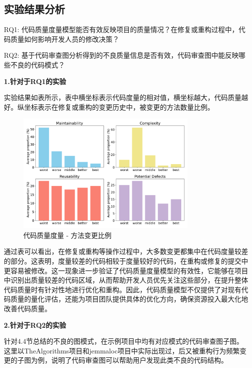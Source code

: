
\subsection{实验结果分析}

RQ1: 代码质量度量模型能否有效反映项目的质量情况？在修复或重构过程中，代码质量如何影响开发人员的修改决策？

RQ2: 基于代码审查图分析得到的不良质量信息是否有效，代码审查图中能反映哪些不良的代码模式？


\textbf{1.针对于RQ1的实验}


实验结果如表所示，表中横坐标表示代码度量的相对值，横坐标越大，代码质量越好。纵坐标表示在修复或重构的变更历史中，被变更的方法数量比例。

\begin{figure}[h]
\centering
\includegraphics[width = 0.8\textwidth]{figures/3_度量模型分析实验.pdf}
\caption{代码质量度量 - 方法变更比例}
\label{1_度量模型分析实验}
\end{figure}


通过表可以看出，在修复或重构等操作过程中，大多数变更都集中在代码度量较差的部分。这表明，度量较差的代码相较于度量较好的代码，在重构或修复的提交中更容易被修改。这一现象进一步验证了代码质量度量模型的有效性，它能够在项目中识别出质量较差的代码区域，从而帮助开发人员优先关注这些部分，在提升整体代码质量时有针对性地进行优化和重构。因此，代码质量模型不仅提供了对现有代码质量的量化评估，还能为项目团队提供具体的优化方向，确保资源投入最大化地改善代码质量。

\textbf{2.针对于RQ2的实验}

针对4.4节总结的不良的图模式，在示例项目中均有对应模式的代码审查图子图。这里以TheAlgorithms项目和jemmaloc项目中实际出现过，后又被重构行为频繁变更的子图为例，说明了代码审查图可以帮助用户发现此类不良的代码结构。


